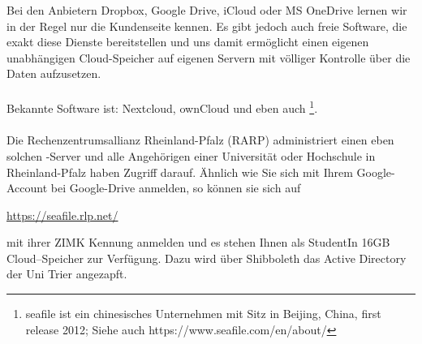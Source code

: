 
\subsubsection{\seafile}
Bei den Anbietern  Dropbox, Google Drive, iCloud oder MS OneDrive lernen wir in der Regel nur die Kundenseite kennen. Es gibt jedoch auch freie Software, die exakt diese Dienste bereitstellen und uns damit ermöglicht einen eigenen unabhängigen Cloud-Speicher auf eigenen Servern mit völliger Kontrolle über die Daten aufzusetzen.\\
~\\
Bekannte Software ist: Nextcloud, ownCloud und eben auch  \footnote{seafile ist ein chinesisches Unternehmen mit Sitz in Beijing,
	China, first release 2012; Siehe auch https://www.seafile.com/en/about/}.\\~\\
Die Rechenzentrumsallianz Rheinland-Pfalz (RARP) administriert einen eben solchen \seafile-Server und alle Angehörigen einer Universität oder Hochschule in Rheinland-Pfalz haben Zugriff darauf. Ähnlich wie Sie sich mit Ihrem Google-Account bei Google-Drive anmelden, so können sie sich auf
 			\begin{center}
 	\url{https://seafile.rlp.net/}
 \end{center}
mit ihrer ZIMK Kennung anmelden und es stehen Ihnen als StudentIn 16GB Cloud--Speicher zur Verfügung. Dazu wird über Shibboleth das Active Directory der Uni Trier angezapft.


